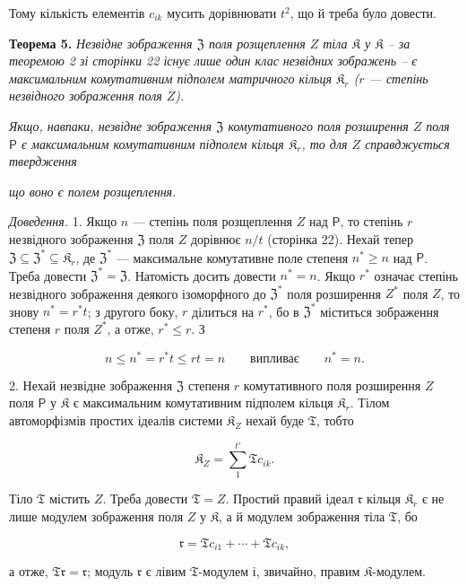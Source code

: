 \documentclass[11pt]{article}
\begin{document}
Тому кількість елементів \(c_{ik}\) мусить дорівнювати \(t^2\), що й треба було довести.

\textbf{Теорема 5.} \emph{Незвідне зображення \(\mathfrak Z\) поля розщеплення \(Z\) тіла \(\mathfrak K\) у \(\mathfrak K\) -- за теоремою 2 зі сторінки 22 існує лише один клас незвідних зображень -- є максимальним комутативним підполем матричного кільця \(\mathfrak K_r\) (\(r\) --- степінь незвідного зображення поля \(Z\)).}

\emph{Якщо, навпаки, незвідне зображення \(\mathfrak Z\) комутативного поля розширення \(Z\) поля \(\mathsf P\) є максимальним комутативним підполем кільця \(\mathfrak K_r\), то для \(Z\) справджується твердження}

\emph{що воно є полем розщеплення.}

\emph{Доведення.} 1. Якщо \(n\) --- степінь поля розщеплення \(Z\) над \(\mathsf P\), то степінь \(r\) незвідного зображення \(\mathfrak Z\) поля \(Z\) дорівнює \(n/t\) (сторінка 22). Нехай тепер \(\mathfrak Z\subseteq\mathfrak Z^*\subseteq\mathfrak K_r\), де \(\mathfrak Z^*\) --- максимальне комутативне поле степеня \(n^*\geq n\) над \(\mathsf P\). Треба довести \(\mathfrak Z^*=\mathfrak Z\). Натомість досить довести \(n^*=n\). Якщо \(r^*\) означає степінь незвідного зображення деякого ізоморфного до \(\mathfrak Z^*\) поля розширення \(Z^*\) поля \(Z\), то знову \(n^*=r^*t\); з другого боку, \(r\) ділиться на \(r^*\), бо в \(\mathfrak Z^*\) міститься зображення степеня \(r\) поля \(Z^*\), а отже, \(r^*\leq r\). З

\[
n\leq n^*=r^*t\leq rt=n \qquad\text{випливає}\qquad n^*=n.
\]

2. Нехай незвідне зображення \(\mathfrak Z\) степеня \(r\) комутативного поля розширення \(Z\) поля \(\mathsf P\) у \(\mathfrak K\) є максимальним комутативним підполем кільця \(\mathfrak K_r\). Тілом автоморфізмів простих ідеалів системи \(\mathfrak K_Z\) нехай буде \(\mathfrak T\), тобто

\[
\mathfrak K_Z=\sum_{1}^{t'}\mathfrak T c_{ik}.
\]

Тіло \(\mathfrak T\) містить \(Z\). Треба довести \(\mathfrak T=Z\). Простий правий ідеал \(\mathfrak r\) кільця \(\mathfrak K_r\) є не лише модулем зображення поля \(Z\) у \(\mathfrak K\), а й модулем зображення тіла \(\mathfrak T\), бо

\[
\mathfrak r=\mathfrak T c_{i1}+\cdots+\mathfrak T c_{ik},
\]

а отже, \(\mathfrak T\mathfrak r=\mathfrak r\); модуль \(\mathfrak r\) є лівим \(\mathfrak T\)-модулем і, звичайно, правим \(\mathfrak K\)-модулем.
\end{document}
